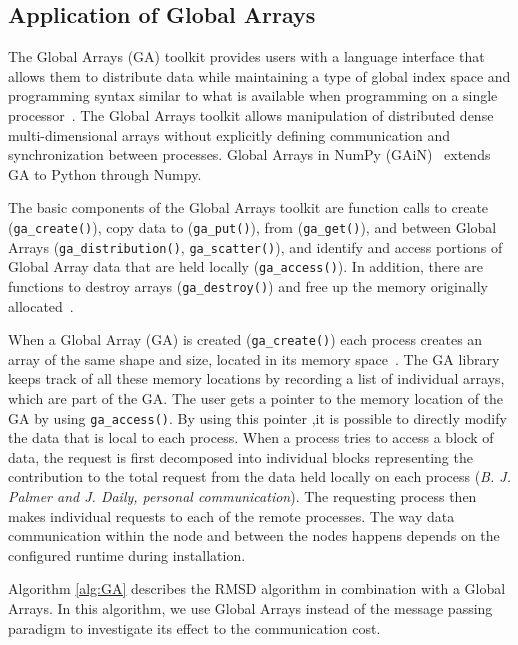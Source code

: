 \subsection{Application of Global Arrays}
The Global Arrays (GA) toolkit provides users with a language interface that allows them to distribute data while maintaining a type of global index space and programming syntax similar to what is available when programming on a single processor~\cite{GA}. The Global Arrays toolkit allows manipulation of distributed dense multi-dimensional arrays without explicitly defining communication and synchronization between processes.
Global Arrays in NumPy (GAiN)~\cite{GAiN} extends GA to Python through Numpy. 

The basic components of the Global Arrays toolkit are function calls to create (\texttt{ga\_create()}), copy data to (\texttt{ga\_put()}), from (\texttt{ga\_get()}), and between Global Arrays (\texttt{ga\_distribution()}, \texttt{ga\_scatter()}), and identify and access portions of Global Array data that are held locally (\texttt{ga\_access()}).
In addition, there are functions to destroy arrays (\texttt{ga\_destroy()}) and free up the memory originally allocated~\cite{GAiN}.

When a Global Array (GA) is created (\texttt{ga\_create()}) each process creates an array of the same shape and size, located in its memory space~\cite{GA}. 
The GA library keeps track of all these memory locations by recording a list of individual arrays, which are part of the GA. 
The user gets a pointer to the memory location of the GA by using \texttt{ga\_access()}.
By using this pointer ,it is possible to directly modify the data that is local to each process.
When a process tries to access a block of data, the request is first decomposed into individual blocks representing the contribution to the total request from the data held locally on each process (\textit{B. J. Palmer and J. Daily, personal communication}).
The requesting process then makes individual requests to each of the remote processes. 
The way data communication within the node and between the nodes happens depends on the configured runtime during installation.

Algorithm \ref{alg:GA} describes the RMSD algorithm in combination with a Global Arrays.
In this algorithm, we use Global Arrays instead of the message passing paradigm to investigate its effect to the communication cost. 

